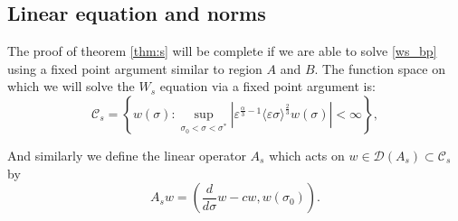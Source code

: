 \documentclass[letterpaper,11pt]{article}
\newcommand{\eps}{\varepsilon}
\numberwithin{equation}{section}
\theoremstyle{plain}
\begin{document}
\subsection{Linear equation and norms}
The proof of theorem \ref{thm:s} will be complete if we are able to solve \eqref{ws_bp} using a fixed point argument similar to region $A$ and $B$. The function space on which we will solve the $W_s$ equation via a fixed point argument is:
\[
\mathcal{C}_s = \left\{ w(\sigma) : \sup_{\sigma_0 < \sigma <\sigma^*} |\eps^{\frac{\alpha}{3} -1 }\langle \eps\sigma \rangle^{\frac{2}{3}} w(\sigma)|<\infty \right\},
\]


And similarly we define the linear operator $A_s$ which acts on $w \in \mathcal{D}(A_s) \subset \mathcal{C}_s$ by \[
A_s w = \left(\frac{d}{d\sigma}w - cw, w(\sigma_0)\right).
\]
\end{document}
